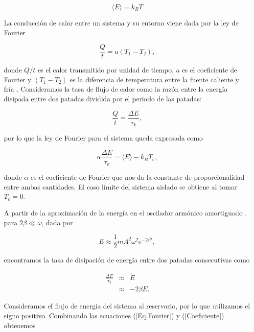 \documentclass[letterpaper,12pt,oneside]{book}
\begin{document}
	\begin{equation}
	\langle E \rangle = k_BT
	\end{equation}
	
	La conducción de calor entre un sistema y su entorno viene dada por la ley de Fourier
	
	\begin{equation}\label{Eq.FourierGeneral}
	\frac{Q}{t} = a(T_1 - T_2),
	\end{equation}
	
	\noindent donde $Q/t$ es el calor transmitido por unidad de tiempo, $a$ es el coeficiente de Fourier y $(T_1 - T_2)$ es la diferencia de temperatura entre la fuente caliente y fría  \cite{ModernTermo}. Consideramos la tasa de flujo de calor como la razón entre la energía disipada entre dos patadas dividida por el periodo de las patadas:
	
	\begin{equation}
	\frac{Q}{t}  = \frac{\Delta E}{\tau_k},
	\end{equation}
	
	\noindent por lo que la ley de Fourier para el sistema queda expresada como
	
	
	\begin{equation}\label{Eq.Fourier}
	\alpha \frac{\Delta E}{\tau_k} = \langle E \rangle - k_BT_e,
	\end{equation}
	
	\noindent donde $\alpha$ es el coeficiente de Fourier que nos da la constante de proporcionalidad entre ambas cantidades. El caso l\'imite del sistema aislado se obtiene al tomar $T_e = 0$.
	
	A partir de la aproximación de la energía en el oscilador armónico amortiguado \cite{Energy}, para $2\beta \ll \omega$, dada por 
	
	\begin{equation}
	E \approx \frac{1}{2}mA^2\omega^2e^{-2\beta t},
	\end{equation}
	
	
	\noindent encontramos la tasa de disipación de energía entre dos patadas consecutivas como
	
	\begin{eqnarray} \label{Coeficiente}
	\frac{\Delta E}{\tau_k} & \approx & \dot{E}\nonumber\\ 
	&\approx& -2\beta E.
	\end{eqnarray}
	
	Consideramos el flujo de energía del sistema al reservorio, por lo que utilizamos el signo positivo. Combinando las ecuaciones (\ref{Eq.Fourier}) y (\ref{Coeficiente}) obtenemos
	
\end{document}
